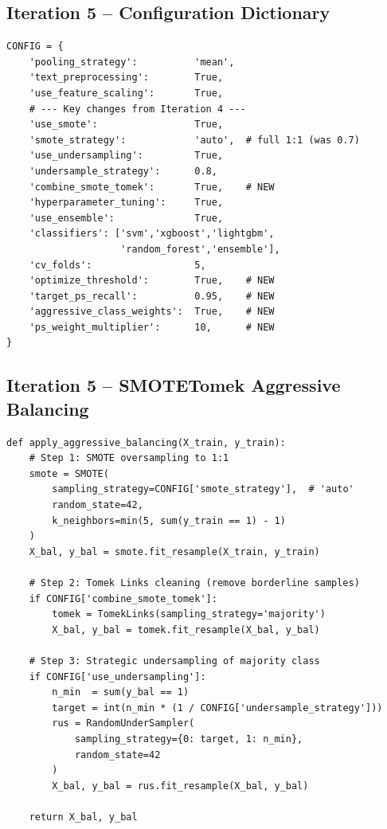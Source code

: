 \documentclass[11pt, titlepage, bibliography=totoc]{scrreprt}
\begin{document}
\subsection*{Iteration 5 -- Configuration Dictionary}

\begin{lstlisting}[label=lst:iter5-config,
  caption={Iteration~5 configuration dictionary, highlighting changes from Iteration~4 (full SMOTE balancing, SMOTETomek, threshold optimisation, 10$\times$ class weight).}]
CONFIG = {
    'pooling_strategy':          'mean',
    'text_preprocessing':        True,
    'use_feature_scaling':       True,
    # --- Key changes from Iteration 4 ---
    'use_smote':                 True,
    'smote_strategy':            'auto',  # full 1:1 (was 0.7)
    'use_undersampling':         True,
    'undersample_strategy':      0.8,
    'combine_smote_tomek':       True,    # NEW
    'hyperparameter_tuning':     True,
    'use_ensemble':              True,
    'classifiers': ['svm','xgboost','lightgbm',
                    'random_forest','ensemble'],
    'cv_folds':                  5,
    'optimize_threshold':        True,    # NEW
    'target_ps_recall':          0.95,    # NEW
    'aggressive_class_weights':  True,    # NEW
    'ps_weight_multiplier':      10,      # NEW
}
\end{lstlisting}

\subsection*{Iteration 5 -- SMOTETomek Aggressive Balancing}

\begin{lstlisting}[label=lst:smotetomek,
  caption={Three-step aggressive balancing pipeline in Iteration~5: SMOTE oversampling, Tomek Links cleaning, and majority-class undersampling.}]
def apply_aggressive_balancing(X_train, y_train):
    # Step 1: SMOTE oversampling to 1:1
    smote = SMOTE(
        sampling_strategy=CONFIG['smote_strategy'],  # 'auto'
        random_state=42,
        k_neighbors=min(5, sum(y_train == 1) - 1)
    )
    X_bal, y_bal = smote.fit_resample(X_train, y_train)

    # Step 2: Tomek Links cleaning (remove borderline samples)
    if CONFIG['combine_smote_tomek']:
        tomek = TomekLinks(sampling_strategy='majority')
        X_bal, y_bal = tomek.fit_resample(X_bal, y_bal)

    # Step 3: Strategic undersampling of majority class
    if CONFIG['use_undersampling']:
        n_min  = sum(y_bal == 1)
        target = int(n_min * (1 / CONFIG['undersample_strategy']))
        rus = RandomUnderSampler(
            sampling_strategy={0: target, 1: n_min},
            random_state=42
        )
        X_bal, y_bal = rus.fit_resample(X_bal, y_bal)

    return X_bal, y_bal
\end{lstlisting}
\end{document}
